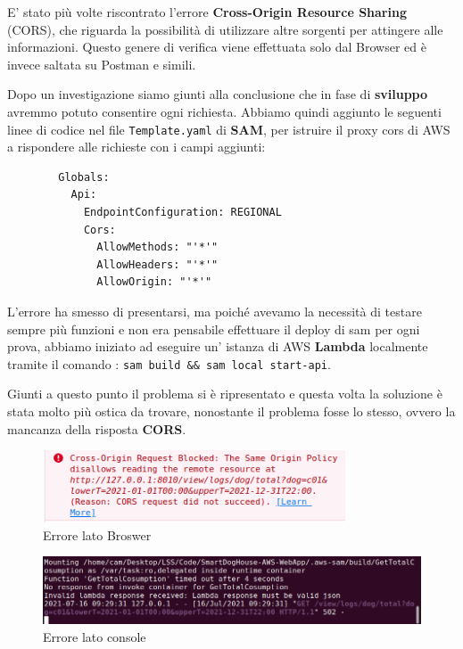         E' stato più volte riscontrato l'errore \textbf{Cross-Origin Resource Sharing} (CORS), che riguarda la possibilità di utilizzare altre sorgenti per attingere alle informazioni. Questo genere di verifica viene effettuata solo dal Browser ed è invece saltata su Postman e simili.
        
        Dopo un investigazione siamo giunti alla conclusione che in fase di \textbf{sviluppo} avremmo potuto consentire ogni richiesta. Abbiamo quindi aggiunto le seguenti linee di codice nel file \texttt{Template.yaml} di \textbf{SAM},  per istruire il proxy cors di AWS a rispondere alle richieste con i campi aggiunti:
        \begin{lstlisting}
        Globals:
          Api:
            EndpointConfiguration: REGIONAL
            Cors:
              AllowMethods: "'*'"
              AllowHeaders: "'*'"
              AllowOrigin: "'*'"
        \end{lstlisting}
        
        L'errore ha smesso di presentarsi, ma poiché avevamo la necessità di testare sempre più funzioni e non era pensabile effettuare il deploy di sam per ogni prova, abbiamo iniziato ad eseguire un' istanza di AWS \textbf{Lambda} localmente tramite il comando : \texttt{sam build \&\& sam local start-api}.
        
        Giunti a questo punto il problema si è ripresentato e questa volta la soluzione è stata molto più ostica da trovare, nonostante il problema fosse lo stesso, ovvero la mancanza della risposta \textbf{CORS}.

        \begin{figure}[H]
            \caption{Errore lato Broswer}
            \label{fig:ErrorCorsBroswer}
            \centering
            \includegraphics[width=0.8\textwidth]{Images/CorsErrorFrontEnd.PNG}
        \end{figure}
        
        \begin{figure}[H]
            \caption{Errore lato console}
            \label{fig:ErrorCorsConsole}
            \centering
            \includegraphics[width=1\textwidth]{Images/CorsErrorConsole.PNG}
        \end{figure}
    
